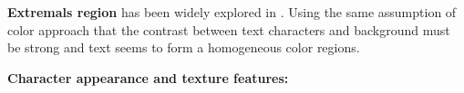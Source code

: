 \textbf{Extremals region} has been widely explored in \cite{Neumann12} \cite{xucheng.2013.pami} \cite{Shi_2013:_MSER}. Using the same assumption of color approach that the contrast between text characters and background must be strong and text seems to form a homogeneous color regions. 


\textbf{Character appearance and texture features: }



